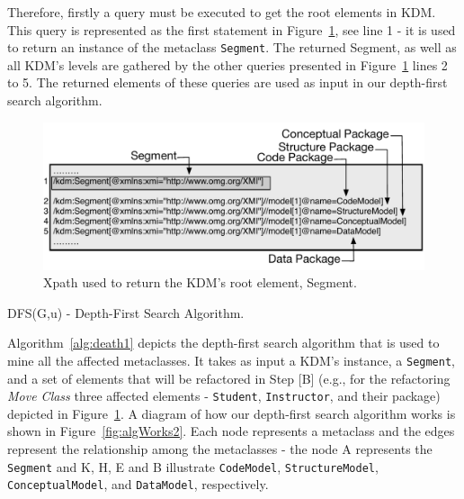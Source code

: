Therefore, firstly a query must be executed to get the root elements in KDM. This query is represented as the first statement in Figure~\ref{fig:queriesXPath}, see line 1 - it is used to return an instance of the metaclass \texttt{Segment}. The returned Segment, as well as all KDM's levels are gathered by the other queries presented in Figure~\ref{fig:queriesXPath} lines 2 to 5. The returned elements of these queries are used as input in our depth-first search algorithm.

\begin{figure}[h]
	\centering
	\includegraphics[scale=0.479]{figuras/queiresANDATLSBESNew}
	\caption{Xpath used to return the KDM's root element, Segment.}
	\label{fig:queriesXPath}
\end{figure}


\begin{algorithm}[h]
     \SetAlgoLined
     \caption{DFS(G,u) - Depth-First Search Algorithm.}
     \label{alg:death1}
   \end{algorithm}

Algorithm~\ref{alg:death1} depicts the depth-first search algorithm that is used to mine all the affected metaclasses. It takes as input a KDM's instance, a \texttt{Segment}, and a set of elements that will be refactored in Step [B] (e.g., for the refactoring \textit{Move Class} three affected elements - \texttt{Student}, \texttt{Instructor}, and their package) depicted in Figure~\ref{fig:queriesXPath}. A diagram of how our depth-first search algorithm works is shown in Figure~\ref{fig:algWorks2}. Each node represents a metaclass and the edges represent the relationship among the metaclasses - the node A represents the \texttt{Segment} and K, H, E and B illustrate \texttt{CodeModel}, \texttt{StructureModel}, \texttt{ConceptualModel}, and \texttt{DataModel}, respectively. 


